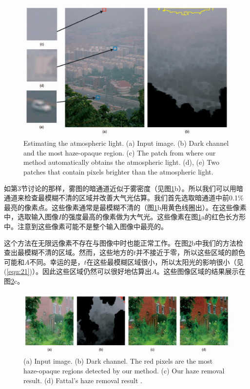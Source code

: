 \documentclass{ctexart}
\begin{document}
\begin{figure}[tbp]
	\centering
	\includegraphics[width=\textwidth]{img/07.jpg}
	\caption{Estimating the atmospheric light. (a) Input image. (b) Dark channel and the most haze-opaque region. (c) The patch from where our method automatically obtains the atmospheric light. (d), (e) Two patches that contain pixels brighter than the atmospheric light.}\label{fig:07}
\end{figure}

如第3节讨论的那样，雾图的暗通道近似于雾密度（见图\ref{fig:07}b）。所以我们可以用暗通道来检查最模糊不清的区域并改善大气光估算。我们首先选取暗通道中前0.1\%最亮的像素点。这些像素通常是最模糊不清的（图\ref{fig:07}b用黄色线圈出）。在这些像素中，选取输入图像$I$的强度最高的像素做为大气光。这些像素在图\ref{fig:07}a的红色长方形中。注意到这些像素可能不是整个输入图像中最亮的。\par

这个方法在无限远像素不存在与图像中时也能正常工作。在图\ref{fig:08}b中我们的方法检查出最模糊不清的区域。然而，这些地方的$t$并不接近于零，所以这些区域的颜色可能和$A$不同。幸运的是，$t$在这些最模糊区域很小，所以太阳光的影响很小（见(\ref{equ:21})）。因此这些区域仍然可以很好地估算出$A$。这些图像区域的结果展示在图\ref{fig:08}c。\par

\begin{figure}[tbp]
	\centering
	\includegraphics[width=\textwidth]{img/08.jpg}
	\caption{(a) Input image. (b) Dark channel. The red pixels are the most haze-opaque regions detected by our method. (c) Our haze removal result. (d) Fattal’s haze removal result \cite{Fattal2008}.}\label{fig:08}
\end{figure}
\end{document}
